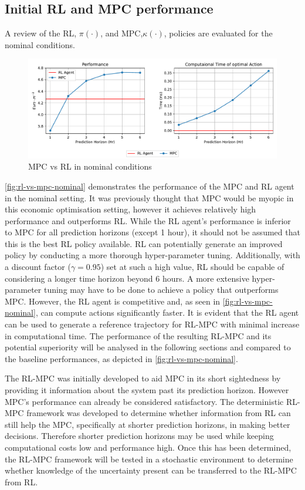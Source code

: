 \subsection{Initial RL and MPC performance}
A review of the RL, $\pi(\cdot)$, and MPC,$\kappa(\cdot)$, policies are evaluated for the nominal conditions.


\begin{figure}[H]
	\centering
	\includegraphics[width=\textwidth]{figures/mpc_vs_rl_nominal.pdf}
	\caption{MPC vs RL in nominal conditions}
	\label{fig:rl-vs-mpc-nominal}
\end{figure}


\autoref{fig:rl-vs-mpc-nominal} demonstrates the performance of the MPC and RL agent in the nominal setting. It was previously thought that MPC would be myopic in this economic optimisation setting, however it achieves relatively high performance and outperforms RL. While the RL agent's performance is inferior to MPC for all prediction horizons (except 1 hour), it should not be assumed that this is the best RL policy available.  RL can potentially generate an improved policy by conducting a more thorough hyper-parameter tuning. Additionally, with a discount factor ($\gamma = 0.95$) set at such a high value, RL should be capable of considering a longer time horizon beyond 6 hours. A more extensive hyper-parameter tuning may have to be done to achieve a policy that outperforms MPC. However, the RL agent is competitive and, as seen in \autoref{fig:rl-vs-mpc-nominal}, can compute actions significantly faster. It is evident that the RL agent can be used to generate a reference trajectory for RL-MPC with minimal increase in computational time. The performance of the resulting RL-MPC and its potential superiority will be analysed in the following sections and compared to the baseline performances, as depicted in \autoref{fig:rl-vs-mpc-nominal}. 

The RL-MPC was initially developed to aid MPC in its short sightedness by providing it information about the system past its prediction horizon. However MPC's performance can already be considered satisfactory. The deterministic RL-MPC framework was developed to determine whether information from RL can still help the MPC, specifically at shorter prediction horizons, in making better decisions. Therefore shorter prediction horizons may be used while keeping computational costs low and performance high. Once this has been determined, the RL-MPC framework will be tested in a stochastic environment to determine whether knowledge of the uncertainty present can be transferred to the RL-MPC from RL.


